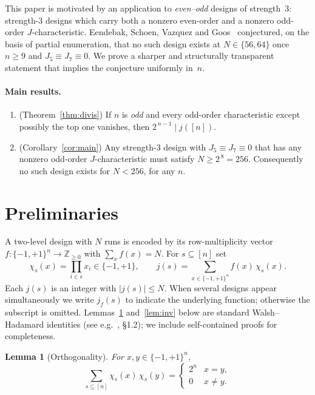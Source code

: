 \documentclass[11pt]{article}
\newtheorem{lemma}[theorem]{Lemma}
\theoremstyle{definition}
\newcommand{\Fpm}{\{-1,+1\}}
\newcommand{\jc}{j}
\begin{document}
This paper is motivated by an application to \emph{even--odd} designs of
strength~$3$: strength-$3$ designs which carry both a nonzero even-order and a
nonzero odd-order $J$-characteristic. Eendebak, Schoen, Vazquez and
Goos~\cite{ESVG2023} conjectured, on the basis of partial enumeration, that
no such design exists at $N\in\{56,64\}$ once $n\ge 9$ and $J_5\equiv J_7\equiv
0$. We prove a sharper and structurally transparent statement that implies the
conjecture uniformly in~$n$.

\paragraph{Main results.}

\begin{enumerate}[nosep]
  \item (Theorem~\ref{thm:divis}) If $n$ is \emph{odd} and every odd-order
        characteristic except possibly the top one vanishes, then
        $2^{\,n-1}\mid \jc([n])$.
  \item (Corollary~\ref{cor:main}) Any strength-3 design with $J_5\equiv
        J_7\equiv 0$ that has any nonzero odd-order $J$-characteristic must
        satisfy $N\ge 2^{\,8}=256$. Consequently no such design exists for
        $N<256$, for any $n$.
\end{enumerate}

\section{Preliminaries}

A two-level design with $N$ runs is
encoded by its row-multiplicity vector $f:\Fpm^n\to\mathbb Z_{\ge 0}$ with
$\sum_x f(x)=N$. For $s\subseteq[n]$ set
\begin{equation}\label{eq:chi-jc}
  \chi_s(x)=\prod_{i\in s} x_i\in\Fpm,
  \qquad
  \jc(s)=\sum_{x\in\Fpm^n} f(x)\,\chi_s(x).
\end{equation}
Each $\jc(s)$ is an integer with $|\jc(s)|\le N$. When several designs appear simultaneously we
write $\jc_f(s)$ to indicate the underlying function; otherwise the subscript
is omitted. Lemmas~\ref{lem:orth} and~\ref{lem:inv} below are standard Walsh--Hadamard identities (see e.g.~\cite{ODonnell2014}, \S1.2); we include self-contained proofs for completeness.

\begin{lemma}[Orthogonality]\label{lem:orth}
For $x,y\in\Fpm^n$,
\begin{equation}\label{eq:orth}
  \sum_{s\subseteq[n]} \chi_s(x)\,\chi_s(y)
  =\begin{cases} 2^n & x=y,\\ 0 & x\ne y.\end{cases}
\end{equation}
\end{lemma}
\end{document}
